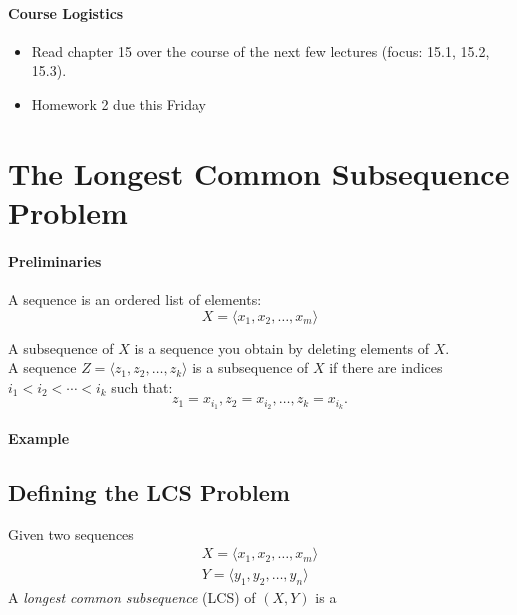 \documentclass[11  pt]{article}
\begin{document}
	
	
	
	\paragraph{Course Logistics}
	
	\begin{itemize}
		\item Read chapter 15 over the course of the next few lectures (focus: 15.1, 15.2, 15.3).
		\item Homework 2 due this Friday
	\end{itemize}

\section{The Longest Common Subsequence Problem}

\paragraph{Preliminaries} A sequence is an ordered list of elements:\\
\begin{equation*}
	X = \langle x_1, x_2, \hdots ,x_m \rangle
\end{equation*}

A subsequence of $X$ is a sequence you obtain by deleting elements of $X$. \\

A sequence $Z = \langle z_1, z_2, \hdots , z_k \rangle$ is a subsequence of $X$ if there are indices $i_1 < i_2 < \cdots < i_k$ such that:
\begin{equation*}
	z_1 = x_{i_1}, z_2 = x_{i_2}, \hdots, z_k = x_{i_k}.
\end{equation*}

\paragraph{Example}


\newpage

\subsection{Defining the LCS Problem}
Given two sequences 
\begin{align*}
	X = \langle x_1, x_2, \hdots ,x_m \rangle \\
	Y = \langle y_1, y_2, \hdots ,y_n \rangle
\end{align*}
A \emph{longest common subsequence} (LCS) of $(X,Y)$ is a \\
\end{document}

